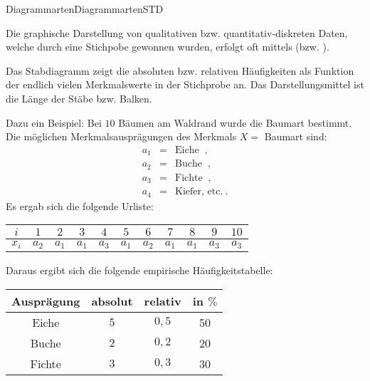 \begin{MXContent}{Diagrammarten}{Diagrammarten}{STD}

Die graphische Darstellung von qualitativen bzw. quantitativ-diskreten Daten, welche durch eine Stichpobe gewonnen wurden,
erfolgt oft mittels  (bzw. ).

\begin{MInfo}
Das Stabdiagramm zeigt die absoluten bzw. relativen Häufigkeiten als Funktion der endlich vielen Merkmalswerte in der Stichprobe an.
Das Darstellungsmittel ist die Länge der Stäbe bzw. Balken.
\end{MInfo}

Dazu ein Beispiel: Bei $10$ Bäumen am Waldrand wurde die Baumart bestimmt. Die möglichen Merkmalsausprägungen des Merkmals
$X=$ Baumart sind: 
\begin{eqnarray*}
a_{1}& =& \text{Eiche} \;\; , \\
a_{2}& =& \text{Buche}\;\; , \\
a_{3}& =& \text{Fichte}\;\; , \\
a_{4}& =& \text{Kiefer, etc.}\: .
\end{eqnarray*}
Es ergab sich die folgende Urliste:

\begin{center}
\begin{tabular}{|c|c|c|c|c|c|c|c|c|c|c|}
\hline
$i$ & $1$ & $2$ & $3$ & $4$ & $5$ & $6$ & $7$ & $8$ & $9$ & $10$ \\ \hline
$x_i$ & $a_2$ & $a_1$ & $a_1$ & $a_3$ & $a_1$ & $a_2$ & $a_1$ & $a_1$ & $a_3$ & $a_3$ \\ \hline
\end{tabular}
\end{center}

Daraus ergibt sich die folgende empirische Häufigkeitstabelle:

\begin{center}
\begin{tabular}{|c|c|c|c|}
\hline
Ausprägung & absolut & relativ & in $\%$\\ \hline
Eiche & $5$ & $0,5$ & 50 \\ \hline
Buche & $2$ & $0,2$ & 20 \\ \hline
Fichte & $3$ & $0,3$ & 30 \\ \hline
\end{tabular}
\end{center}


\end{MXContent}
